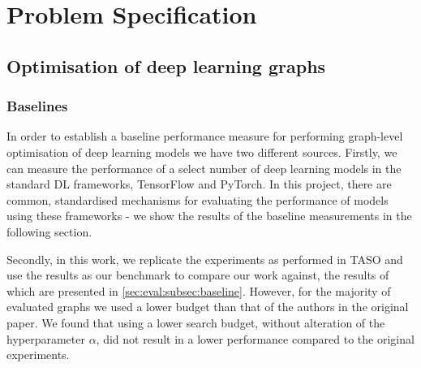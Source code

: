 \chapter{Problem Specification}


\section{Optimisation of deep learning graphs}




\subsection{Baselines}
In order to establish a baseline performance measure for performing graph-level optimisation of deep learning models we have two different sources. Firstly, we can measure the performance of a select number of deep learning models in the standard DL frameworks, TensorFlow and PyTorch. In this project, there are common, standardised mechanisms for evaluating the performance of models using these frameworks - we show the results of the baseline measurements in the following section.

Secondly, in this work, we replicate the experiments as performed in TASO and use the results as our benchmark to compare our work against, the results of which are presented in \ref{sec:eval:subsec:baseline}. However, for the majority of evaluated graphs we used a lower budget than that of the authors in the original paper. We found that using a lower search budget, without alteration of the hyperparameter $\alpha$, did not result in a lower performance compared to the original experiments.

